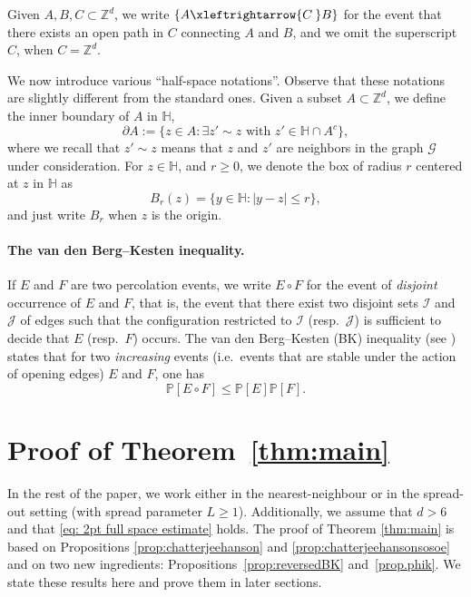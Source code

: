 \documentclass[11pt,a4paper]{article}
\numberwithin{equation}{section}
\theoremstyle{plain}
\theoremstyle{definition}
\newcommand{\connect}{\xleftrightarrow}
\begin{document}
Given $A,B,C\subset \mathbb Z^d$, we write $\{A\connect{C\:}B\}$ for the event that there exists an open path in $C$ connecting $A$ and $B$, and we omit the superscript $C$, when $C= \mathbb Z^d$. 

We now introduce various ``half-space notations''. Observe that these notations are slightly different from the standard ones. Given a subset $A\subset \mathbb Z^d$, we define the inner boundary of $A$ in $\mathbb H$,
\begin{equation}
\partial A := \{z \in A : \exists z'\sim z \text{ with }z'\in \mathbb H \cap A^c\},
\end{equation} where we recall that $z'\sim z$ means that $z$ and $z'$ are neighbors in the graph $\mathcal G$ under consideration.  For $z\in \mathbb H$, and $r\ge 0$, we denote the box of radius $r$ centered at $z$ in $\mathbb H$ as 
\begin{equation}
B_r(z) = \{y\in \mathbb H : |y-z |\le r\},
\end{equation}
and just write $B_r$ when $z$ is the origin.

\paragraph{The van den Berg--Kesten inequality.} If $E$ and $F$ are two percolation events, we write $E\circ F$ for the event of \emph{disjoint} occurrence of $E$ and $F$, that is, the event that there exist two disjoint sets $\mathcal I$ and $\mathcal J$ of edges such that the configuration restricted to $\mathcal I$ (resp.~$\mathcal J$) is sufficient to decide that $E$ (resp.~$F$) occurs. The van den Berg--Kesten (BK) inequality (see \cite[Section~2.3]{GrimmettPercolation1999}) states that for two \emph{increasing} events (i.e.~events that are stable under the action of opening edges) $E$ and $F$, one has
\begin{equation}\label{eq:BK ineq}
\mathbb P[E\circ F]\le \mathbb P[E]\mathbb P[F].\tag{BK}
\end{equation}

\section{Proof of Theorem~\ref{thm:main}}
In the rest of the paper, we work either in the nearest-neighbour or in the spread-out setting (with spread parameter $L\geq 1$). Additionally, we assume that $d>6$ and that \eqref{eq: 2pt full space estimate} holds. The proof of Theorem \ref{thm:main} is based on Propositions \ref{prop:chatterjeehanson} and \ref{prop:chatterjeehansonsosoe} and on two new ingredients: Propositions~\ref{prop:reversedBK} and~\ref{prop.phik}. We state these results here and prove them in later sections. 
\end{document}
